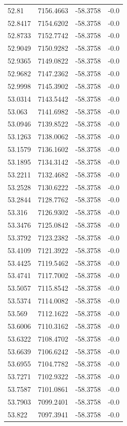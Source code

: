 \begin{table}[H]
\begin{tabular}{llll}
52.81 & 7156.4663 & -58.3758 & -0.0 \\
52.8417 & 7154.6202 & -58.3758 & -0.0 \\
52.8733 & 7152.7742 & -58.3758 & -0.0 \\
52.9049 & 7150.9282 & -58.3758 & -0.0 \\
52.9365 & 7149.0822 & -58.3758 & -0.0 \\
52.9682 & 7147.2362 & -58.3758 & -0.0 \\
52.9998 & 7145.3902 & -58.3758 & -0.0 \\
53.0314 & 7143.5442 & -58.3758 & -0.0 \\
53.063 & 7141.6982 & -58.3758 & -0.0 \\
53.0946 & 7139.8522 & -58.3758 & -0.0 \\
53.1263 & 7138.0062 & -58.3758 & -0.0 \\
53.1579 & 7136.1602 & -58.3758 & -0.0 \\
53.1895 & 7134.3142 & -58.3758 & -0.0 \\
53.2211 & 7132.4682 & -58.3758 & -0.0 \\
53.2528 & 7130.6222 & -58.3758 & -0.0 \\
53.2844 & 7128.7762 & -58.3758 & -0.0 \\
53.316 & 7126.9302 & -58.3758 & -0.0 \\
53.3476 & 7125.0842 & -58.3758 & -0.0 \\
53.3792 & 7123.2382 & -58.3758 & -0.0 \\
53.4109 & 7121.3922 & -58.3758 & -0.0 \\
53.4425 & 7119.5462 & -58.3758 & -0.0 \\
53.4741 & 7117.7002 & -58.3758 & -0.0 \\
53.5057 & 7115.8542 & -58.3758 & -0.0 \\
53.5374 & 7114.0082 & -58.3758 & -0.0 \\
53.569 & 7112.1622 & -58.3758 & -0.0 \\
53.6006 & 7110.3162 & -58.3758 & -0.0 \\
53.6322 & 7108.4702 & -58.3758 & -0.0 \\
53.6639 & 7106.6242 & -58.3758 & -0.0 \\
53.6955 & 7104.7782 & -58.3758 & -0.0 \\
53.7271 & 7102.9322 & -58.3758 & -0.0 \\
53.7587 & 7101.0861 & -58.3758 & -0.0 \\
53.7903 & 7099.2401 & -58.3758 & -0.0 \\
53.822 & 7097.3941 & -58.3758 & -0.0 \\

\end{tabular}
\end{table}
